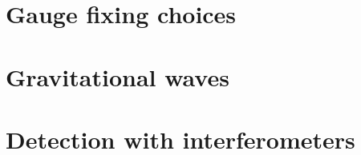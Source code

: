 \documentclass[a4paper]{article}
\begin{document}
\section{Gauge fixing choices}



\section{Gravitational waves}



\section{Detection with interferometers}


\nocite{carrol, wik, cas}
\printbibliography
\end{document}
